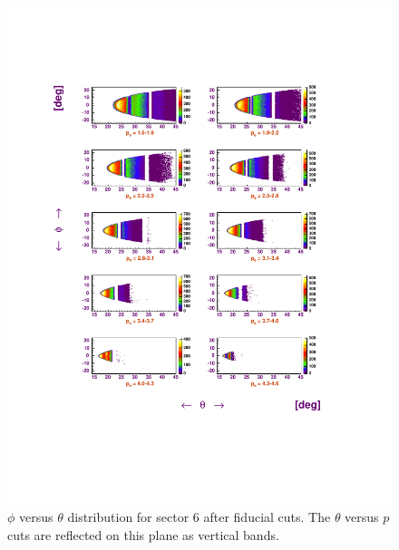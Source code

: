 \begin{figure}
 \begin{center}
 \includegraphics[width = 14cm, bb=60 120 520 700]{data_reduction/img/summary_sec6}  
  \caption[$\phi$ versus $\theta$ distribution for sector 6 after fiducial cuts]
          { $\phi$ versus $\theta$ distribution for sector 6 after fiducial cuts. The $\theta$ versus
                     $p$ cuts are reflected on this plane as vertical bands. }
 \label{fig:sum_s6}
 \end{center}
\end{figure}












